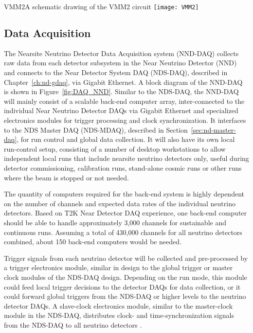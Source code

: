 \begin{cdrfigure}{VMM2}{A schematic drawing of the VMM2 circuit}
\texttt{[image: VMM2]}
\end{cdrfigure}


\subsection{Data Acquisition} %

The Nearsite Neutrino Detector Data Acquisition system (NND-DAQ) collects raw data from 
each %
detector subsystem in the Near Neutrino Detector (NND) and connects to the Near 
Detector System DAQ (NDS-DAQ), described in Chapter~\ref{ch:nd-gdaq}, via Gigabit Ethernet. A block diagram of the NND-DAQ is
shown in Figure~\ref{fig:DAQ_NND}.
Similar to the NDS-DAQ, the NND-DAQ will mainly consist 
of a scalable back-end computer array, inter-connected to the individual Near Neutrino 
Detector DAQs via Gigabit Ethernet and specialized electronics modules for trigger 
processing and clock synchronization. It interfaces to the NDS Master DAQ (NDS-MDAQ),
described in Section~\ref{sec:nd-master-daq}, for 
run control and global  data collection. It will also have its own local run-control setup, 
consisting of a number of desktop workstations to allow independent local runs that include 
nearsite neutrino detectors  only, useful during detector commissioning, calibration runs, 
stand-alone cosmic runs or other runs where the beam is stopped or not needed.

The quantity of computers required for the back-end system is highly dependent on the 
number of channels and expected data rates of the individual neutrino detectors. Based on 
T2K Near Detector DAQ experience, one back-end computer should be able to handle 
approximately 3,000 channels for sustainable and continuous runs. Assuming a total of 
430,000 channels for all neutrino detectors  combined, about 150 back-end computers would be 
needed.

Trigger signals from each neutrino detector  will be collected and pre-processed by a 
trigger electronics module, similar in design to the global   trigger or master clock modules 
of the NDS-DAQ design. Depending on the run mode, this module could feed local trigger 
decisions to the detector DAQs for data collection, or it could forward global   triggers 
from the NDS-DAQ or higher levels to the neutrino detector DAQs.  A slave-clock electronics 
module, similar to the master-clock module in the NDS-DAQ, distributes clock- and 
time-synchronization signals from the NDS-DAQ to all neutrino detectors   .


